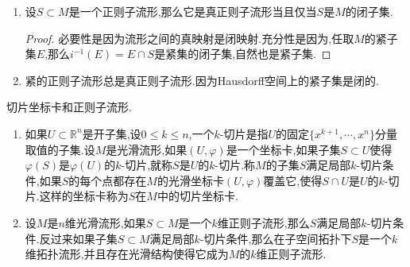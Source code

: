 \begin{enumerate}
\begin{proof}
    	为证明它是真正则子流形,需验证明映射$F:U\to M\times N$是真映射.但是我们有如下一般结论:如果$F:X\to Y$是连续映射,$Y$是Hausdorff的,并且$F$有连续左逆,那么$F$是真映射.我们这里映射$F$具有光滑左逆$\pi:M\times N\to M$,即有$\pi\circ F$是$U$上恒等映射.这说明$F$是真映射.
    \end{proof}
    \item 设$S\subset M$是一个正则子流形,那么它是真正则子流形当且仅当$S$是$M$的闭子集.
    \begin{proof}
    	
    	必要性是因为流形之间的真映射是闭映射.充分性是因为,任取$M$的紧子集$E$,那么$i^{-1}(E)=E\cap S$是紧集的闭子集,自然也是紧子集.
    \end{proof}
    \item 紧的正则子流形总是真正则子流形.因为Hausdorff空间上的紧子集是闭的.
\end{enumerate}

切片坐标卡和正则子流形.
\begin{enumerate}
	\item 如果$U\subset\mathbb{R}^n$是开子集,设$0\le k\le n$,一个$k$-切片是指$U$的固定$\{x^{k+1},\cdots,x^n\}$分量取值的子集.设$M$是光滑流形,如果$(U,\varphi)$是一个坐标卡,如果子集$S\subset U$使得$\varphi(S)$是$\varphi(U)$的$k$-切片,就称$S$是$U$的$k$-切片.称$M$的子集$S$满足局部$k$-切片条件,如果$S$的每个点都存在$M$的光滑坐标卡$(U,\varphi)$覆盖它,使得$S\cap U$是$U$的$k$-切片.这样的坐标卡称为$S$在$M$中的切片坐标卡.
	\item 设$M$是$n$维光滑流形,如果$S\subset M$是一个$k$维正则子流形,那么$S$满足局部$k$-切片条件.反过来如果子集$S\subset M$满足局部$k$-切片条件,那么在子空间拓扑下$S$是一个$k$维拓扑流形,并且存在光滑结构使得它成为$M$的$k$维正则子流形.
\end{enumerate}

